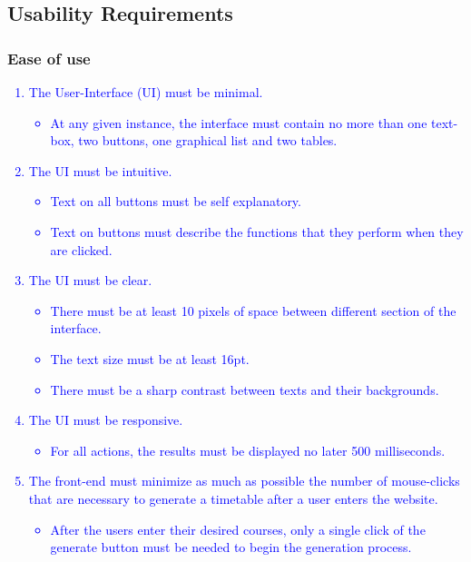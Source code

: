 \documentclass[12pt]{article}
\begin{document}
\subsection{Usability Requirements}
\subsubsection{Ease of use}
\textcolor{blue}{
\begin{enumerate}
    \item The User-Interface (UI) must be minimal.
    \begin{itemize}
        \item At any given instance, the interface must contain no more than one text-box, two buttons, one graphical list and two tables.
    \end{itemize}
    \item The UI must be intuitive.
    \begin{itemize}
        \item Text on all buttons must be self explanatory.
        \item Text on buttons must describe the functions that they perform when they are clicked.
    \end{itemize}
    \item The UI must be clear.
    \begin{itemize}
        \item There must be at least 10 pixels of space between different section of the interface.
        \item The text size must be at least 16pt.
        \item There must be a sharp contrast between texts and their backgrounds.
    \end{itemize}
    \item The UI must be responsive.
    \begin{itemize}
        \item For all actions, the results must be displayed no later 500 milliseconds.
    \end{itemize}
    \item The front-end must minimize as much as possible the number of mouse-clicks that are necessary to generate a timetable after a user enters the website.
    \begin{itemize}
        \item After the users enter their desired courses, only a single click of the generate button must be needed to begin the generation process.
    \end{itemize}
\end{enumerate}
}
\end{document}
